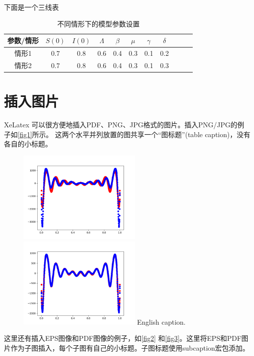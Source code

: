 下面是一个三线表
\begin{table}[htbp]
  \centering
  \caption{\heiti{}不同情形下的模型参数设置}
            
  \label{tab:parameter}
  \begin{tabular}{ccccccccccc}
    \toprule
    参数/情形 & $S(0)$ & $I(0)$ & $\Lambda$ & $\beta$ & $\mu$ & $\gamma$ & $\delta$  \\
    \midrule
    情形1 & 0.7 & 0.8 & 0.6 & 0.4 & 0.3 & 0.1 & 0.2 \\
    情形2 & 0.7 & 0.8 & 0.6 & 0.4 & 0.3 & 0.1 & 0.3 \\
    \bottomrule
  \end{tabular}
\end{table}
\section{插入图片}

XeLatex 可以很方便地插入PDF、PNG、JPG格式的图片。插入PNG/JPG的例子如\autoref{fig1}所示。
这两个水平并列放置的图共享一个“图标题”(table caption)，没有各自的小标题。

\begin{figure}[htp]
	\centering
	\includegraphics[width=6cm]{figure/example/model1_1000.png}
	\hspace{1cm}
	\includegraphics[width=6cm]{figure/example/model1_10000.png}
	{English caption.}
	\label{fig1}
\end{figure}

这里还有插入EPS图像和PDF图像的例子，如\autoref{fig2} 和\autoref{fig3}。这里将EPS和PDF图片作为子图插入，每个子图有自己的小标题。子图标题使用subcaption宏包添加。


